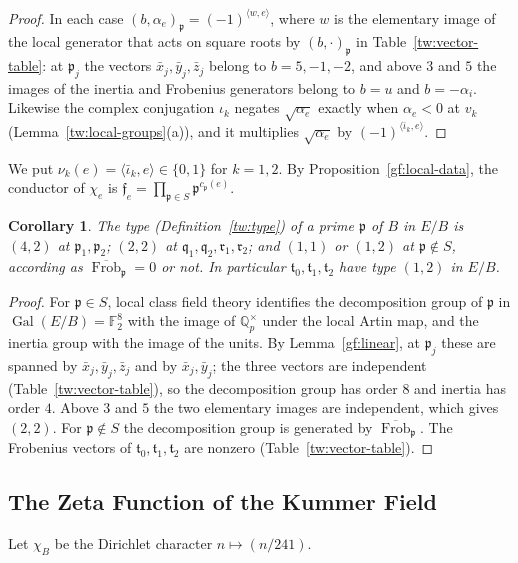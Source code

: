 \documentclass[11pt]{amsart}
\numberwithin{equation}{section}
\newtheorem{corollary}[equation]{Corollary}
\theoremstyle{definition}
\theoremstyle{remark}
\DeclareMathOperator{\Gal}{Gal}
\DeclareMathOperator{\Frob}{Frob}
\newcommand{\Ftwo}{\mathbb F_2}
\newcommand{\Q}{\mathbb Q}
\begin{document}
\begin{proof}
In each case $(b,\alpha_e)_{\mathfrak p}=(-1)^{\langle w,e\rangle}$, where $w$
is the elementary image of the local generator that acts on square roots by
$(b,\cdot)_{\mathfrak p}$ in Table~\ref{tw:vector-table}: at $\mathfrak p_j$
the vectors $\bar x_j,\bar y_j,\bar z_j$ belong to $b=5,-1,-2$, and above
$3$ and $5$ the images of the inertia and Frobenius generators belong to
$b=u$ and $b=-\alpha_i$. Likewise the complex conjugation $\iota_k$ negates
$\sqrt{\alpha_e}$ exactly when $\alpha_e<0$ at $v_k$
(Lemma~\ref{tw:local-groups}(a)), and it multiplies $\sqrt{\alpha_e}$ by
$(-1)^{\langle\bar\iota_k,e\rangle}$.
\end{proof}

We put $\nu_k(e)=\langle\bar\iota_k,e\rangle\in\{0,1\}$ for $k=1,2$. By
Proposition~\ref{gf:local-data}, the conductor of $\chi_e$
is $\mathfrak f_e=\prod_{\mathfrak p\in S}\mathfrak p^{c_{\mathfrak p}(e)}$.

\begin{corollary}\label{gf:types}
The type (Definition~\ref{tw:type}) of a prime $\mathfrak p$ of $B$ in
$E/B$ is $(4,2)$ at $\mathfrak p_1,\mathfrak p_2$; $(2,2)$ at
$\mathfrak q_1,\mathfrak q_2,\mathfrak r_1,\mathfrak r_2$; and $(1,1)$ or
$(1,2)$ at $\mathfrak p\notin S$, according as $\overline{\Frob}_{\mathfrak p}=0$
or not.
In particular $\mathfrak t_0,\mathfrak t_1,\mathfrak t_2$ have type $(1,2)$
in $E/B$.
\end{corollary}

\begin{proof}
For $\mathfrak p\in S$, local class field theory identifies the
decomposition group of $\mathfrak p$ in $\Gal(E/B)=\Ftwo^8$ with the image
of $\Q_p^\times$ under the local Artin map, and the inertia group with the
image of the units. By Lemma~\ref{gf:linear}, at $\mathfrak p_j$ these are
spanned by $\bar x_j,\bar y_j,\bar z_j$ and by $\bar x_j,\bar y_j$; the three
vectors are independent (Table~\ref{tw:vector-table}), so the decomposition
group has order $8$ and inertia has order $4$. Above $3$ and $5$ the two
elementary images are independent, which gives $(2,2)$. For
$\mathfrak p\notin S$ the decomposition group is generated by
$\overline{\Frob}_{\mathfrak p}$. The Frobenius vectors of $\mathfrak t_0,\mathfrak
t_1,\mathfrak t_2$ are nonzero (Table~\ref{tw:vector-table}).
\end{proof}

\subsection{The Zeta Function of the Kummer Field}
Let $\chi_B$ be the Dirichlet character $n\mapsto(n/241)$.
\end{document}

